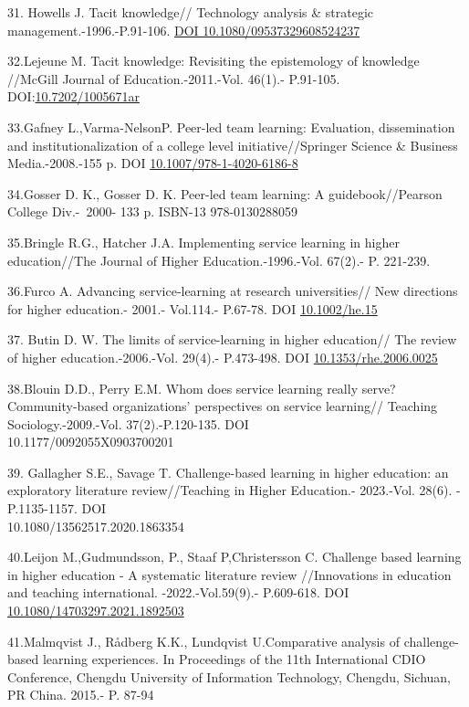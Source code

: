 \begin{references}
31. Howells J. Tacit knowledge// Technology analysis \& strategic
management.-1996.-P.91-106.
\href{https://doi.org/10.1080/09537329608524237}{DOI
10.1080/09537329608524237}

32.Lejeune M. Tacit knowledge: Revisiting the epistemology of knowledge
//McGill Journal of Education.-2011.-Vol. 46(1).- P.91-105.
DOI:\href{http://dx.doi.org/10.7202/1005671ar}{10.7202/1005671ar}

33.Gafney L.,Varma-NelsonP. Peer-led team learning: Evaluation,
dissemination and institutionalization of a college level
initiative//Springer Science \& Business Media.-2008.-155 p.
DOI \href{http://dx.doi.org/10.1007/978-1-4020-6186-8}{10.1007/978-1-4020-6186-8}

34.Gosser D. K., Gosser D. K. Peer-led team learning: A
guidebook//Pearson College Div.-~2000- 133 p. ISBN-13 ‏ ~978-0130288059

35.Bringle R.G., Hatcher J.A. Implementing service learning in higher
education//The Journal of Higher Education.-1996.-Vol. 67(2).- P.
221-239.

36.Furco A. Advancing service‐learning at research universities// New
directions for higher education.- 2001.- Vol.114.- P.67-78. DOI
\href{http://dx.doi.org/10.1002/he.15}{10.1002/he.15}

37. Butin D. W. The limits of service-learning in higher education// The
review of higher education.-2006.-Vol. 29(4).- P.473-498. DOI
\href{http://dx.doi.org/10.1353/rhe.2006.0025}{10.1353/rhe.2006.0025}

38.Blouin D.D., Perry E.M. Whom does service learning really serve?
Community-based organizations'{} perspectives on service
learning// Teaching Sociology.-2009.-Vol. 37(2).-P.120-135.
DOI \\10.1177/0092055X0903700201

39. Gallagher S.E., Savage T. Challenge-based learning in higher
education: an exploratory literature review//Teaching in Higher
Education.- 2023.-Vol. 28(6). - P.1135-1157.
DOI \\10.1080/13562517.2020.1863354

40.Leijon M.,Gudmundsson, P., Staaf P,Christersson C. Challenge based
learning in higher education - A systematic literature review
//Innovations in education and teaching international.
-2022.-Vol.59(9).- P.609-618. DOI
\href{http://dx.doi.org/10.1080/14703297.2021.1892503}{10.1080/14703297.2021.1892503}

41.Malmqvist J., Rådberg K.K., Lundqvist U.Comparative analysis of
challenge-based learning experiences. In Proceedings of the 11th
International CDIO Conference, Chengdu University of Information
Technology, Chengdu, Sichuan, PR China. 2015.- P. 87-94


\end{references}
